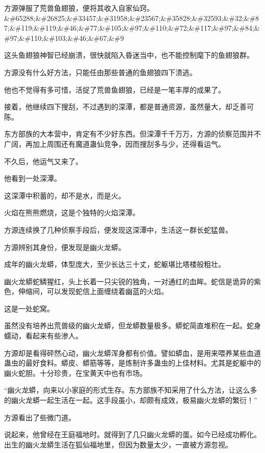 
\begin{this_body}

方源弹服了荒兽鱼翅狼，便将其收入自家仙窍。\&\#65288;\&\#26825;\&\#33457;\&\#31958;\&\#23567;\&\#35828;\&\#32593;\&\#32;\&\#87;\&\#119;\&\#119;\&\#46;\&\#77;\&\#105;\&\#97;\&\#110;\&\#72;\&\#117;\&\#97;\&\#84;\&\#97;\&\#110;\&\#103;\&\#46;\&\#67;\&\#9

这头鱼翅狼神智已经崩溃，很快就陷入昏迷当中，也不能控制麾下的鱼翅狼群。

方源没有什么好方法，只能任由那些普通的鱼翅狼四下溃逃。

他也不觉得有多可惜，活捉了荒兽鱼翅狼，已经是一笔丰厚的成果了。

接着，他继续四下搜刮，不过遇到的深潭，都是普通资源，虽然量大，却乏善可陈。

东方部族的大本营中，肯定有不少好东西。但深潭千千万万，方源的侦察范围并不广阔，再加上周围还有魔道蛊仙竞争，因而搜刮多与少，还得看运气。

不久后，他运气又来了。

他看到一处深潭。

这深潭中积蓄的，却不是水，而是火。

火焰在熊熊燃烧，这是个独特的火焰深潭。

方源连续换了几种侦察手段后，便发现这深潭中，生活这一群长蛇猛兽。

方源辨别其身份，便发现是幽火龙蟒。

成年的幽火龙蟒，体型庞大，至少长达三十丈，蛇躯堪比塔楼般粗壮。

幽火龙蟒蛇鳞猩红，头上长着一只尖锐的独角，一对通红的血眸。蛇信是诡异的紫色，伸缩间，可以发现蛇信上面缠绕着幽蓝的火焰。

这是一处蛇窝。

虽然没有培养出荒兽级的幽火龙蟒，但龙蟒数量极多。蟒蛇简直堆积在一起。蛇身蠕动，看起来有些渗人。

方源却是看得砰然心动，幽火龙蟒浑身都有价值。譬如蟒血，是用来喂养某些血道蛊虫的最好食料。蟒皮、蟒筋等等，是炼制许多蛊虫的上佳材料。尤其是蛇躯中的幽火蛇胆。十分珍贵，在宝黄天中也有市场。

“幽火龙蟒，向来以小家庭的形式生存。东方部族不知采用了什么方法，让这么多的幽火龙蟒一起生活在一起。这手段虽小，却颇有成效，极易幽火龙蟒的繁衍！”

方源看出了些微门道。

说起来，他曾经在王庭福地时。就得到了几只幽火龙蟒的蛋。如今已经成功孵化。出生的幽火龙蟒生活在狐仙福地里，但因为数量太少，一直被方源忽视。


\end{this_body}
